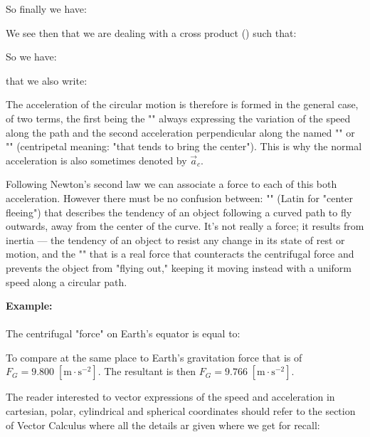 	So finally we have:
	
	We see then that we are dealing with a cross product () such that:
	
	So we have:
	
	that we also write:
	
	The acceleration of the circular motion is therefore is formed in the general case, of two terms, the first being the "" always expressing the variation of the speed along the path and the second acceleration perpendicular along the named "" or "" (centripetal meaning: "that tends to bring the center"). This is why the normal acceleration is also sometimes denoted by  $\vec{a}_c$.
	
	\begin{tcolorbox}[title=Remark,colframe=black,arc=10pt]
	Following Newton's second law we can associate a force to each of this both acceleration. However there must be no confusion between: "" (Latin for "center fleeing") that describes the tendency of an object following a curved path to fly outwards, away from the center of the curve. It's not really a force; it results from inertia — the tendency of an object to resist any change in its state of rest or motion, and the "" that is a real force that counteracts the centrifugal force and prevents the object from "flying out," keeping it moving instead with a uniform speed along a circular path.
	\end{tcolorbox}
	\begin{tcolorbox}[colframe=black,colback=white,sharp corners]
	\textbf{{\Large {}}Example:}\\\\
	The centrifugal "force" on Earth's equator is equal to:
	
	To compare at the same place to Earth's gravitation force that is of $F_G=9.800\;[\text{m}\cdot \text{s}^{-2}]$. The resultant is then $F_G=9.766\;[\text{m}\cdot \text{s}^{-2}]$.
	\end{tcolorbox}
	The reader interested to vector expressions of the speed and acceleration in cartesian, polar, cylindrical and spherical coordinates should refer to the section of Vector Calculus where all the details ar given where we get for recall:

